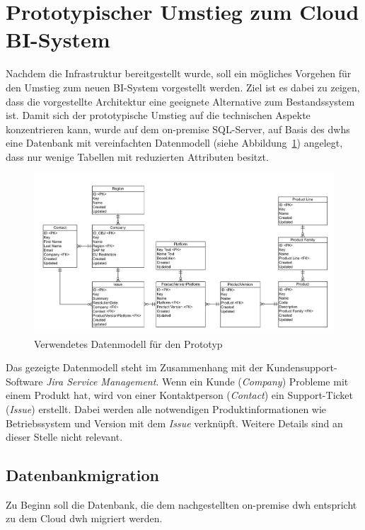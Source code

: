 \section{Prototypischer Umstieg zum Cloud BI-System} \label{sec:praktischeUmsetzung:Migration}
Nachdem die Infrastruktur bereitgestellt wurde, soll ein mögliches Vorgehen für den Umstieg zum neuen BI-System vorgestellt werden. Ziel ist es dabei zu zeigen, dass die vorgestellte Architektur eine geeignete Alternative zum Bestandssystem ist. Damit sich der prototypische Umstieg auf die technischen Aspekte konzentrieren kann, wurde auf dem on-premise SQL-Server, auf Basis des \acp{dwh} eine Datenbank mit vereinfachten Datenmodell (siehe Abbildung~\ref{fig:praktischeUmsetzung:dataModel}) angelegt, dass nur wenige Tabellen mit reduzierten Attributen besitzt. 

\begin{figure}[htbp]
 \centering
 \includegraphics[width=\textwidth]{gfx/data_model.png}
 \caption{Verwendetes Datenmodell für den Prototyp}
\label{fig:praktischeUmsetzung:dataModel}
\end{figure}

\noindent Das gezeigte Datenmodell steht im Zusammenhang mit der Kundensupport-Software \textit{Jira Service Management}. Wenn ein Kunde (\textit{Company}) Probleme mit einem Produkt hat, wird von einer Kontaktperson (\textit{Contact}) ein Support-Ticket (\textit{Issue}) erstellt. Dabei werden alle notwendigen Produktinformationen wie Betriebssystem und Version mit dem \textit{Issue} verknüpft. Weitere Details sind an dieser Stelle nicht relevant.

\subsection{Datenbankmigration} \label{subsec:praktischeUmsetzung:Datenmigration}
Zu Beginn soll die Datenbank, die dem nachgestellten on-premise \ac{dwh} entspricht zu dem Cloud \ac{dwh} migriert werden. 


